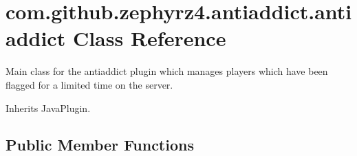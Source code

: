 \hypertarget{classcom_1_1github_1_1zephyrz4_1_1antiaddict_1_1antiaddict}{\section{com.\-github.\-zephyrz4.\-antiaddict.\-antiaddict \-Class \-Reference}
\label{classcom_1_1github_1_1zephyrz4_1_1antiaddict_1_1antiaddict}
}


\-Main class for the antiaddict plugin which manages players which have been flagged for a limited time on the server.  




\-Inherits \-Java\-Plugin.

\subsection*{\-Public \-Member \-Functions}
